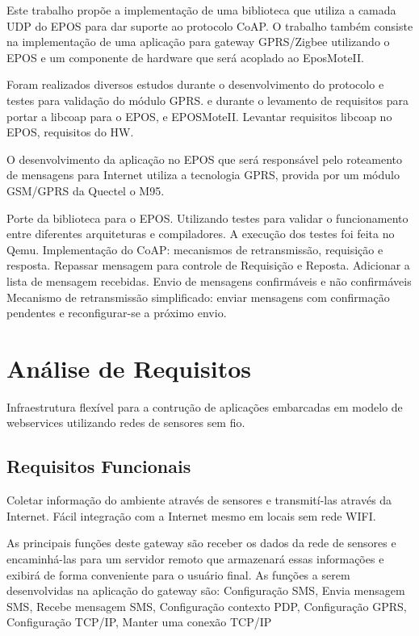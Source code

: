 Este trabalho prop\~oe a implementa\c{c}\~ao de uma biblioteca que utiliza a camada UDP do EPOS para dar suporte ao protocolo CoAP. O trabalho tamb\'em consiste na implementa\c{c}\~ao de uma aplica\c{c}\~ao para gateway GPRS/Zigbee utilizando o EPOS e um componente de hardware que ser\'a acoplado ao EposMoteII.

Foram realizados diversos estudos durante o desenvolvimento do protocolo e testes para valida\c{c}\~ao do m\'odulo GPRS. e durante o levamento de requisitos para portar a libcoap para o EPOS, e EPOSMoteII. Levantar requisitos libcoap no EPOS, requisitos do HW.

O desenvolvimento da aplica\c{c}\~ao no EPOS que ser\'a respons\'avel pelo roteamento de mensagens para Internet utiliza a tecnologia GPRS, provida por um m\'odulo GSM/GPRS da Quectel o M95.

Porte da biblioteca para o EPOS. Utilizando testes para validar o funcionamento entre diferentes arquiteturas e compiladores. A execu\c{c}\~ao dos testes foi feita no Qemu. Implementa\c{c}\~ao do CoAP: mecanismos de retransmiss\~ao, requisi\c{c}\~ao e resposta.
Repassar mensagem para controle de Requisi\c{c}\~ao e Reposta.  Adicionar a lista de mensagem recebidas.  Envio de mensagens confirm\'aveis e n\~ao confirm\'aveis Mecanismo de retransmiss\~ao simplificado: enviar mensagens com confirma\c{c}\~ao pendentes e reconfigurar-se a pr\'oximo envio.

\section{An\'alise de Requisitos}
Infraestrutura flex\'ivel para a contru\c{c}\~ao de aplica\c{c}\~oes embarcadas em modelo de webservices utilizando redes de sensores sem fio.
\subsection{Requisitos Funcionais}{
Coletar informa\c{c}\~ao do ambiente atrav\'es de sensores e transmit\'i-las atrav\'es da Internet. F\'acil integra\c{c}\~ao com a Internet mesmo em locais sem rede WIFI.

As principais fun\c{c}\~oes deste gateway s\~ao receber os dados da rede de sensores e encaminh\'a-las para um servidor remoto que armazenar\'a essas informa\c{c}\~oes e exibir\'a de forma conveniente para o usu\'ario final. As fun\c{c}\~oes a serem desenvolvidas na aplica\c{c}\~ao do gateway s\~ao:
Configura\c{c}\~ao SMS, Envia mensagem SMS, Recebe mensagem SMS, Configura\c{c}\~ao contexto PDP, Configura\c{c}\~ao GPRS, Configura\c{c}\~ao TCP/IP, Manter uma conex\~ao TCP/IP
}

